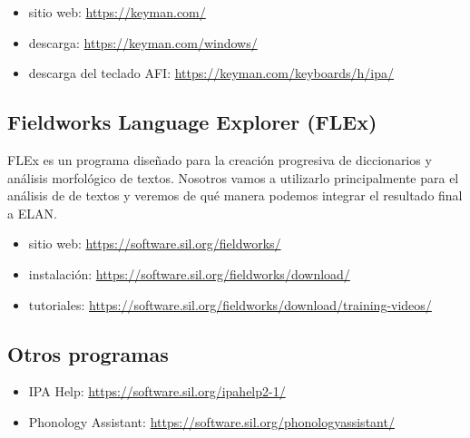 \documentclass[12pt]{article}
\begin{document}
\begin{itemize}
\item sitio web: \url{https://keyman.com/}
\item descarga: \url{https://keyman.com/windows/}
\item descarga del teclado AFI: \url{https://keyman.com/keyboards/h/ipa/}
\end{itemize}

\subsection{Fieldworks Language Explorer (FLEx)}
FLEx es un programa diseñado para la creación progresiva de diccionarios y análisis morfológico de textos. Nosotros vamos a utilizarlo principalmente para el análisis de de textos y veremos de qué manera podemos integrar el resultado final a ELAN. 

\begin{itemize}
\item sitio web: \url{https://software.sil.org/fieldworks/}

\item instalación: \url{https://software.sil.org/fieldworks/download/}

\item tutoriales: \url{https://software.sil.org/fieldworks/download/training-videos/}
\end{itemize}

\subsection{Otros programas}

\begin{itemize}
\item IPA Help: \url {https://software.sil.org/ipahelp2-1/}
\item Phonology Assistant: \url{https://software.sil.org/phonologyassistant/}
\end{itemize}



\end{document}
